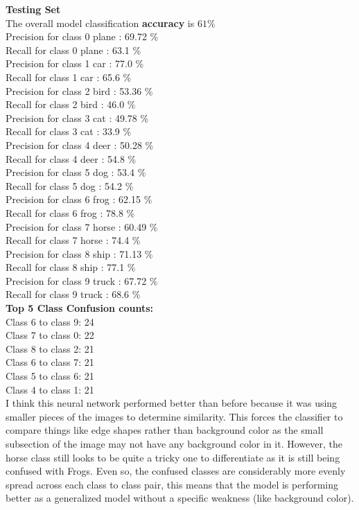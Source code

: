 \documentclass[submit]{harvardml}
\begin{document}
\begin{enumerate}
    \textbf{Testing Set} \\
    The overall model classification \textbf{accuracy} is $61\%$\\
    Precision for class 0 plane : 69.72 \% \\
    Recall for class 0 plane : 63.1 \% \\
    Precision for class 1 car : 77.0 \% \\
    Recall for class 1 car : 65.6 \% \\
    Precision for class 2 bird : 53.36 \% \\
    Recall for class 2 bird : 46.0 \% \\
    Precision for class 3 cat : 49.78 \% \\
    Recall for class 3 cat : 33.9 \% \\
    Precision for class 4 deer : 50.28 \% \\
    Recall for class 4 deer : 54.8 \% \\
    Precision for class 5 dog : 53.4 \% \\
    Recall for class 5 dog : 54.2 \% \\
    Precision for class 6 frog : 62.15 \% \\
    Recall for class 6 frog : 78.8 \% \\
    Precision for class 7 horse : 60.49 \% \\
    Recall for class 7 horse : 74.4 \% \\
    Precision for class 8 ship : 71.13 \% \\
    Recall for class 8 ship : 77.1 \% \\
    Precision for class 9 truck : 67.72 \% \\
    Recall for class 9 truck : 68.6 \% \\
    
    
    \textbf{Top 5 Class Confusion counts:}\\
    Class 6 to class 9: 24 \\
    Class 7 to class 0: 22 \\
    Class 8 to class 2: 21 \\
    Class 6 to class 7: 21 \\
    Class 5 to class 6: 21 \\
    Class 4 to class 1: 21 \\
    
    I think this neural network performed better than before because it was using smaller pieces of the images to determine similarity. This forces the classifier to compare things like edge shapes rather than background color as the small subsection of the image may not have any background color in it. However, the horse class still looks to be quite a tricky one to differentiate as it is still being confused with Frogs. Even so, the confused classes are considerably more evenly spread across each class to class pair, this means that the model is performing better as a generalized model without a specific weakness (like background color).
    
\end{enumerate}
\end{document}

